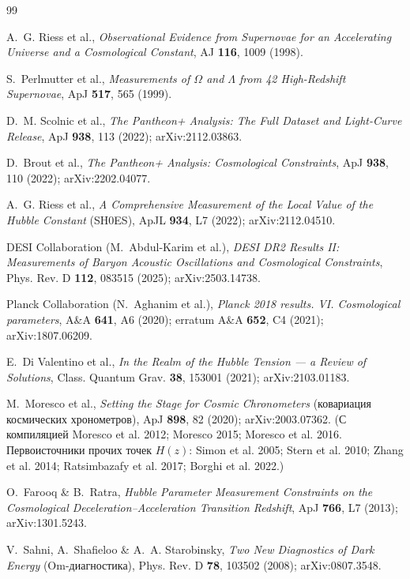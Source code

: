 \documentclass{article}
\begin{document}
\begin{thebibliography}{99}

 A.~G. Riess et al., \textit{Observational Evidence from Supernovae for an Accelerating Universe and a Cosmological Constant}, AJ \textbf{116}, 1009 (1998).

 S.~Perlmutter et al., \textit{Measurements of $\Omega$ and $\Lambda$ from 42 High-Redshift Supernovae}, ApJ \textbf{517}, 565 (1999).

 D.~M. Scolnic et al., \textit{The Pantheon+ Analysis: The Full Dataset and Light-Curve Release}, ApJ \textbf{938}, 113 (2022); arXiv:2112.03863.

 D.~Brout et al., \textit{The Pantheon+ Analysis: Cosmological Constraints}, ApJ \textbf{938}, 110 (2022); arXiv:2202.04077.

 A.~G. Riess et al., \textit{A Comprehensive Measurement of the Local Value of the Hubble Constant} (SH0ES), ApJL \textbf{934}, L7 (2022); arXiv:2112.04510.

 DESI Collaboration (M.~Abdul-Karim et al.), \textit{DESI DR2 Results II: Measurements of Baryon Acoustic Oscillations and Cosmological Constraints}, Phys. Rev. D \textbf{112}, 083515 (2025); arXiv:2503.14738.

 Planck Collaboration (N.~Aghanim et al.), \textit{Planck 2018 results. VI. Cosmological parameters}, A\&A \textbf{641}, A6 (2020); erratum A\&A \textbf{652}, C4 (2021); arXiv:1807.06209.

 E.~Di Valentino et al., \textit{In the Realm of the Hubble Tension --- a Review of Solutions}, Class. Quantum Grav. \textbf{38}, 153001 (2021); arXiv:2103.01183.

 M.~Moresco et al., \textit{Setting the Stage for Cosmic Chronometers} (ковариация космических хронометров), ApJ \textbf{898}, 82 (2020); arXiv:2003.07362. (С компиляцией Moresco et al. 2012; Moresco 2015; Moresco et al. 2016. Первоисточники прочих точек $H(z)$: Simon et al. 2005; Stern et al. 2010; Zhang et al. 2014; Ratsimbazafy et al. 2017; Borghi et al. 2022.)

 O.~Farooq \& B.~Ratra, \textit{Hubble Parameter Measurement Constraints on the Cosmological Deceleration--Acceleration Transition Redshift}, ApJ \textbf{766}, L7 (2013); arXiv:1301.5243.

 V.~Sahni, A.~Shafieloo \& A.~A. Starobinsky, \textit{Two New Diagnostics of Dark Energy} (Om-диагностика), Phys. Rev. D \textbf{78}, 103502 (2008); arXiv:0807.3548.


\end{thebibliography}
\end{document}
